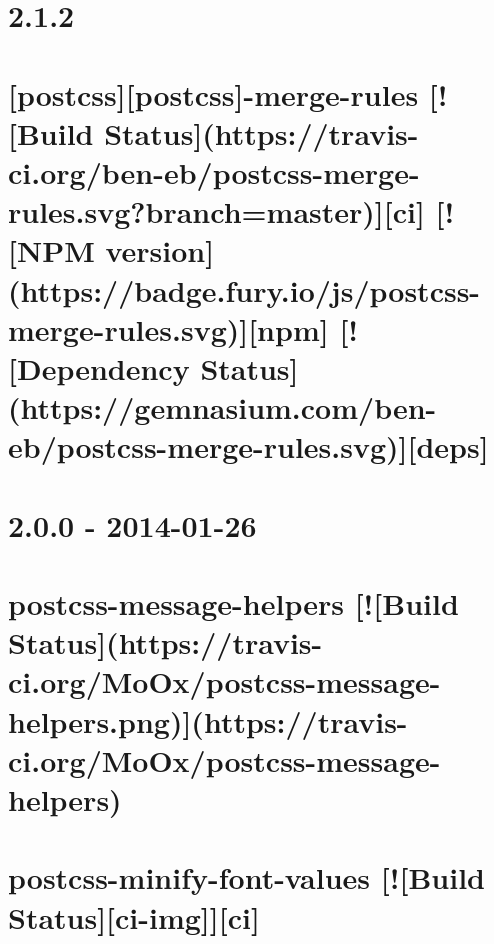 \documentclass[twoside]{book}
\newcommand{\+}{\discretionary{\mbox{\scriptsize$\hookleftarrow$}}{}{}}
\begin{document}
\chapter{2.1.2}
\label{md__c_1_workspace_demo_src_main_script_node_modules_postcss-merge-rules__c_h_a_n_g_e_l_o_g}

\chapter{\mbox{[}postcss\mbox{]}\mbox{[}postcss\mbox{]}-\/merge-\/rules \mbox{[}!\mbox{[}Build Status\mbox{]}(https\+://travis-\/ci.org/ben-\/eb/postcss-\/merge-\/rules.svg?branch=master)\mbox{]}\mbox{[}ci\mbox{]} \mbox{[}!\mbox{[}N\+PM version\mbox{]}(https\+://badge.fury.\+io/js/postcss-\/merge-\/rules.svg)\mbox{]}\mbox{[}npm\mbox{]} \mbox{[}!\mbox{[}Dependency Status\mbox{]}(https\+://gemnasium.com/ben-\/eb/postcss-\/merge-\/rules.svg)\mbox{]}\mbox{[}deps\mbox{]}}
\label{md__c_1_workspace_demo_src_main_script_node_modules_postcss-merge-rules__r_e_a_d_m_e}

\chapter{2.0.0 -\/ 2014-\/01-\/26}
\label{md__c_1_workspace_demo_src_main_script_node_modules_postcss-message-helpers__c_h_a_n_g_e_l_o_g}

\chapter{postcss-\/message-\/helpers \mbox{[}!\mbox{[}Build Status\mbox{]}(https\+://travis-\/ci.org/\+Mo\+Ox/postcss-\/message-\/helpers.png)\mbox{]}(https\+://travis-\/ci.org/\+Mo\+Ox/postcss-\/message-\/helpers)}
\label{md__c_1_workspace_demo_src_main_script_node_modules_postcss-message-helpers__r_e_a_d_m_e}

\chapter{postcss-\/minify-\/font-\/values \mbox{[}!\mbox{[}Build Status\mbox{]}\mbox{[}ci-\/img\mbox{]}\mbox{]}\mbox{[}ci\mbox{]}}
\label{md__c_1_workspace_demo_src_main_script_node_modules_postcss-minify-font-values__r_e_a_d_m_e}

\end{document}
